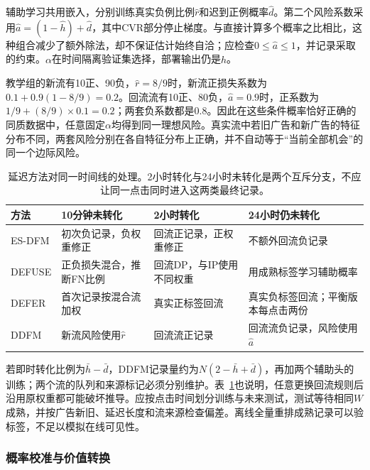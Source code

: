辅助学习共用嵌入，分别训练真实负例比例$\widehat r$和迟到正例概率$\widehat d$。第二个风险系数采用$\widehat a=(1-\widehat h)+\widehat d$，其中CVR部分停止梯度。与直接计算多个概率之比相比，这种组合减少了额外除法，却不保证估计始终自洽；应检查$0\leq\widehat a\leq1$，并记录采取的约束。$\alpha$在时间隔离验证集选择，部署输出仍是$\widehat h$。

教学组的新流有10正、90负，$\widehat r=8/9$时，新流正损失系数为$0.1+0.9(1-8/9)=0.2$。回流流有10正、80负，$\widehat a=0.9$时，正系数为$1/9+(8/9)\times0.1=0.2$；两套负系数都是0.8。因此在这些条件概率恰好正确的同质数据中，任意固定$\alpha$均得到同一理想风险。真实流中若旧广告和新广告的特征分布不同，两套风险分别在各自特征分布上正确，并不自动等于“当前全部机会”的同一个边际风险。

\begin{table}[htbp]
  \centering
  \small
  \begin{tabularx}{\linewidth}{@{}lXXX@{}}
    \toprule
    方法 & 10分钟未转化 & 2小时转化 & 24小时仍未转化\\
    \midrule
    ES-DFM & 初次负记录，负权重修正 & 回流正记录，正权重修正 & 不额外回流负记录\\
    DEFUSE & 正负损失混合，推断FN比例 & 回流DP，与IP使用不同权重 & 用成熟标签学习辅助概率\\
    DEFER & 首次记录按混合流加权 & 真实正标签回流 & 真实负标签回流；平衡版本每点击两份\\
    DDFM & 新流风险使用$\widehat r$ & 回流流正记录 & 回流流负记录，风险使用$\widehat a$\\
    \bottomrule
  \end{tabularx}
  \caption{延迟方法对同一时间线的处理。2小时转化与24小时未转化是两个互斥分支，不应让同一点击同时进入这两类最终记录。}
  \label{tab:rs-advertising-delay-methods}
\end{table}

若即时转化比例为$\bar h-\bar d$，DDFM记录量约为$N(2-\bar h+\bar d)$，再加两个辅助头的训练；两个流的队列和来源标记必须分别维护。表~\ref{tab:rs-advertising-delay-methods}也说明，任意更换回流规则后沿用原权重都可能破坏推导。应按点击时间划分训练与未来测试，测试等待相同$W$成熟，并按广告新旧、延迟长度和流来源检查偏差。离线全量重排成熟记录可以验标签，不足以模拟在线可见性。

\subsubsection{概率校准与价值转换}
\label{sec:rs-advertising-calibration}

